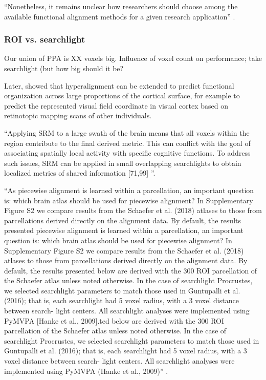 ``Nonetheless, it remains unclear how researchers should choose among the
available functional alignment methods for a given research application''
\citep{bazeille2021empirical}.


\subsubsection{ROI vs. searchlight}



%
Our union of PPA is XX voxels big.
%
Influence of voxel count on performance; take searchlight (but how big should it
be?

Later, \citet{guntupalli2016model} showed that hyperalignment can be extended to
predict functional organization across large proportions of the cortical
surface, for example to predict the represented visual field coordinate in
visual cortex based on retinotopic mapping scans of other individuals.

``Applying SRM to a large swath of the brain means that all voxels within the
region contribute to the final derived metric. This can conflict with the goal
of associating spatially local activity with specific cognitive functions. To
address such issues, SRM can be applied in small overlapping searchlights to
obtain localized metrics of shared information [71,99]
\citep{cohen2017computational}''.

``As piecewise alignment is learned within a parcellation, an important question
is: which brain atlas should be used for piecewise alignment? In Supplementary
Figure S2 we compare results from the Schaefer et al. (2018) atlases to those
from parcellations derived directly on the alignment data. By default, the
results presented piecewise alignment is learned within a parcellation, an
important question is: which brain atlas should be used for piecewise alignment?
In Supplementary Figure S2 we compare results from the Schaefer et al. (2018)
atlases to those from parcellations derived directly on the alignment data. By
default, the results presented below are derived with the 300 ROI parcellation
of the Schaefer atlas unless noted otherwise. In the case of searchlight
Procrustes, we selected searchlight parameters to match those used in Guntupalli
et al. (2016); that is, each searchlight had 5 voxel radius, with a 3 voxel
distance between search- light centers. All searchlight analyses were
implemented using PyMVPA [Hanke et al., 2009].ted below are derived with the 300
ROI parcellation of the Schaefer atlas unless noted otherwise. In the case of
searchlight Procrustes, we selected searchlight parameters to match those used
in Guntupalli et al. (2016); that is, each searchlight had 5 voxel radius, with
a 3 voxel distance between search- light centers. All searchlight analyses were
implemented using PyMVPA (Hanke et al., 2009)'' \citep{bazeille2021empirical}.

